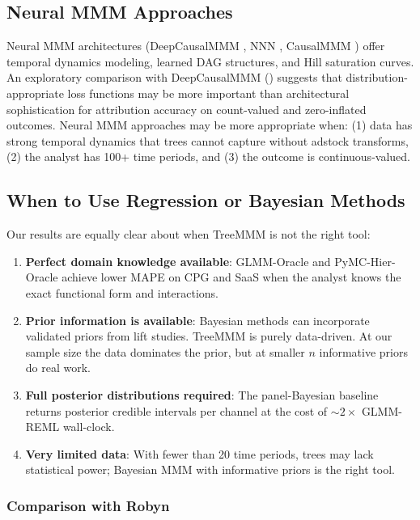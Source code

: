 \documentclass[review,12pt]{elsarticle}
\begin{document}
\subsection{Neural MMM Approaches}
\label{sec:discussion:neural}

Neural MMM architectures (DeepCausalMMM \cite{tirumala2025deepcausalmmm}, NNN
\cite{mulc2025nnn}, CausalMMM \cite{gong2024causalmmm}) offer temporal dynamics
modeling, learned DAG structures, and Hill saturation curves. An exploratory
comparison with DeepCausalMMM () suggests that
distribution-appropriate loss functions may be more important than architectural
sophistication for attribution accuracy on count-valued and zero-inflated
outcomes. Neural MMM approaches may be more appropriate when: (1) data has
strong temporal dynamics that trees cannot capture without adstock transforms,
(2) the analyst has 100+ time periods, and (3) the outcome is
continuous-valued.

\subsection{When to Use Regression or Bayesian Methods}
\label{sec:discussion:when_regression}

Our results are equally clear about when TreeMMM is not the right tool:
\begin{enumerate}
\item \textbf{Perfect domain knowledge available}: GLMM-Oracle and
  PyMC-Hier-Oracle achieve lower MAPE on CPG and SaaS when the analyst knows
  the exact functional form and interactions.
\item \textbf{Prior information is available}: Bayesian methods can incorporate
  validated priors from lift studies. TreeMMM is purely data-driven. At our
  sample size the data dominates the prior, but at smaller $n$ informative
  priors do real work.
\item \textbf{Full posterior distributions required}: The panel-Bayesian
  baseline returns posterior credible intervals per channel at the cost of
  $\sim 2\times$ GLMM-REML wall-clock.
\item \textbf{Very limited data}: With fewer than 20 time periods, trees may
  lack statistical power; Bayesian MMM with informative priors is the right tool.
\end{enumerate}

\subsubsection{Comparison with Robyn}
\label{sec:discussion:robyn}
\end{document}
